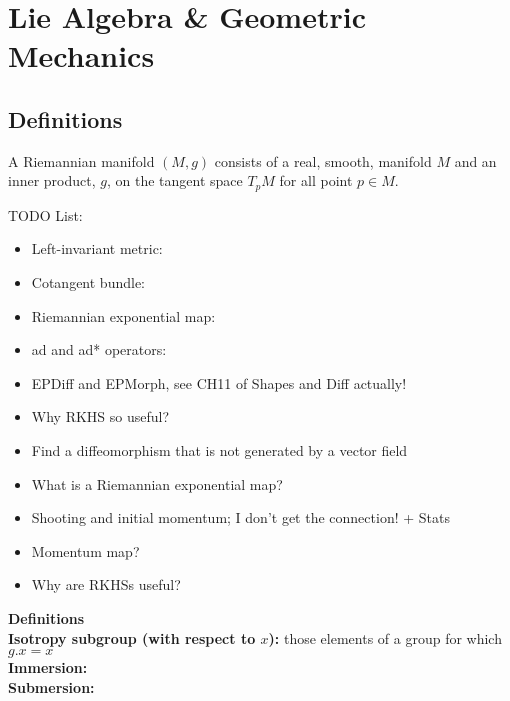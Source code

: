 \chapter{Lie Algebra \& Geometric Mechanics}

\section{Definitions}
\begin{definition}
A Riemannian manifold $(M,g)$ consists of a real, smooth, manifold $M$ and an inner product, $g$, on the tangent space $T_pM$ for all point $p\in M$.
\end{definition}

\begin{definition}
\end{definition}

TODO List:
\begin{itemize}
\item Left-invariant metric:
\item Cotangent bundle:
\item Riemannian exponential map:
\item ad and ad* operators:
\item EPDiff and EPMorph, see CH11 of Shapes and Diff actually!
\item Why RKHS so useful?
\item Find a diffeomorphism that is not generated by a vector field
\item What is a Riemannian exponential map?
\item Shooting and initial momentum; I don't get the connection! + Stats
\item Momentum map?
\item Why are RKHSs useful?
\end{itemize}

{\Large\textbf{Definitions}}\\[0.5cm]
\textbf{Isotropy subgroup (with respect to $x$):} those elements of a group for which $g.x = x$\\
\textbf{Immersion:}\\
\textbf{Submersion:}\\
